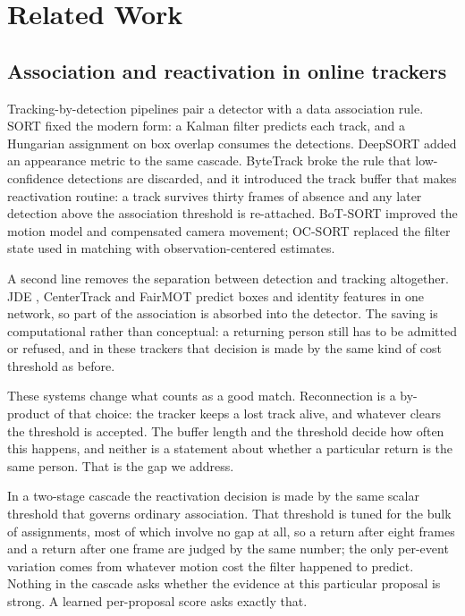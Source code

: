 \section{Related Work}

\subsection{Association and reactivation in online trackers}

Tracking-by-detection pipelines pair a detector with a data association
rule. SORT \cite{bewley2016sort} fixed the modern form: a Kalman filter
\cite{kalman1960} predicts each track, and a Hungarian assignment
\cite{kuhn1955} on box overlap consumes the detections. DeepSORT
\cite{wojke2017deepsort} added an appearance
metric to the same cascade. ByteTrack \cite{zhang2022bytetrack} broke the
rule that low-confidence detections are discarded, and it introduced the
track buffer that makes reactivation routine: a track survives thirty
frames of absence and any later detection above the association threshold
is re-attached. BoT-SORT \cite{aharon2022botsort} improved the motion model
and compensated camera movement; OC-SORT \cite{cao2023ocsort} replaced the
filter state used in matching with observation-centered estimates.

A second line removes the separation between detection and tracking
altogether. JDE \cite{wang2020jde}, CenterTrack \cite{zhou2020centertrack}
and FairMOT \cite{zhang2021fairmot} predict boxes and identity features in
one network, so part of the association is absorbed into the detector. The
saving is computational rather than conceptual: a returning person still has
to be admitted or refused, and in these trackers that decision is made by
the same kind of cost threshold as before.

These systems change what counts as a good match. Reconnection is a
by-product of that choice: the tracker keeps a lost track alive, and
whatever clears the threshold is accepted. The buffer length and the
threshold decide how often this happens, and neither is a statement about
whether a particular return is the same person. That is the gap we
address.

In a two-stage cascade the reactivation decision is made by the same scalar
threshold that governs ordinary association. That threshold is tuned for
the bulk of assignments, most of which involve no gap at all, so a return
after eight frames and a return after one frame are judged by the same
number; the only per-event variation comes from whatever motion cost the
filter happened to predict. Nothing in the cascade asks whether the
evidence at this particular proposal is strong. A learned per-proposal
score asks exactly that.

